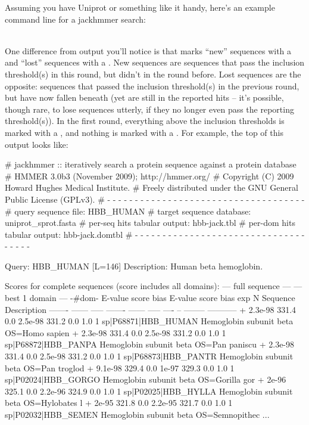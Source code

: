 Assuming you have Uniprot or something like it handy, here's an
example command line for a jackhmmer search:

\\

One difference from  output you'll notice is that
 marks ``new'' sequences with a \ccode{+} and ``lost''
sequences with a \ccode{-}. New sequences are sequences that pass the
inclusion threshold(s) in this round, but didn't in the round before.
Lost sequences are the opposite: sequences that passed the inclusion
threshold(s) in the previous round, but have now fallen beneath (yet
are still in the reported hits -- it's possible, though rare, to lose
sequences utterly, if they no longer even pass the reporting
threshold(s)).  In the first round, everything above the inclusion
thresholds is marked with a \ccode{+}, and nothing is marked with a
\ccode{-}. For example, the top of this output looks like:

\begin{sreoutput}
# jackhmmer :: iteratively search a protein sequence against a protein database
# HMMER 3.0b3 (November 2009); http://hmmer.org/
# Copyright (C) 2009 Howard Hughes Medical Institute.
# Freely distributed under the GNU General Public License (GPLv3).
# - - - - - - - - - - - - - - - - - - - - - - - - - - - - - - - - - - - -
# query sequence file:             HBB_HUMAN
# target sequence database:        uniprot_sprot.fasta
# per-seq hits tabular output:     hbb-jack.tbl
# per-dom hits tabular output:     hbb-jack.domtbl
# - - - - - - - - - - - - - - - - - - - - - - - - - - - - - - - - - - - -

Query:       HBB_HUMAN  [L=146]
Description: Human beta hemoglobin.

Scores for complete sequences (score includes all domains):
   --- full sequence ---   --- best 1 domain ---    -#dom-
    E-value  score  bias    E-value  score  bias    exp  N  Sequence              Description
    ------- ------ -----    ------- ------ -----   ---- --  --------              -----------
+   2.3e-98  331.4   0.0    2.5e-98  331.2   0.0    1.0  1  sp|P68871|HBB_HUMAN   Hemoglobin subunit beta OS=Homo sapien
+   2.3e-98  331.4   0.0    2.5e-98  331.2   0.0    1.0  1  sp|P68872|HBB_PANPA   Hemoglobin subunit beta OS=Pan paniscu
+   2.3e-98  331.4   0.0    2.5e-98  331.2   0.0    1.0  1  sp|P68873|HBB_PANTR   Hemoglobin subunit beta OS=Pan troglod
+   9.1e-98  329.4   0.0      1e-97  329.3   0.0    1.0  1  sp|P02024|HBB_GORGO   Hemoglobin subunit beta OS=Gorilla gor
+     2e-96  325.1   0.0    2.2e-96  324.9   0.0    1.0  1  sp|P02025|HBB_HYLLA   Hemoglobin subunit beta OS=Hylobates l
+     2e-95  321.8   0.0    2.2e-95  321.7   0.0    1.0  1  sp|P02032|HBB_SEMEN   Hemoglobin subunit beta OS=Semnopithec
...
\end{sreoutput}

